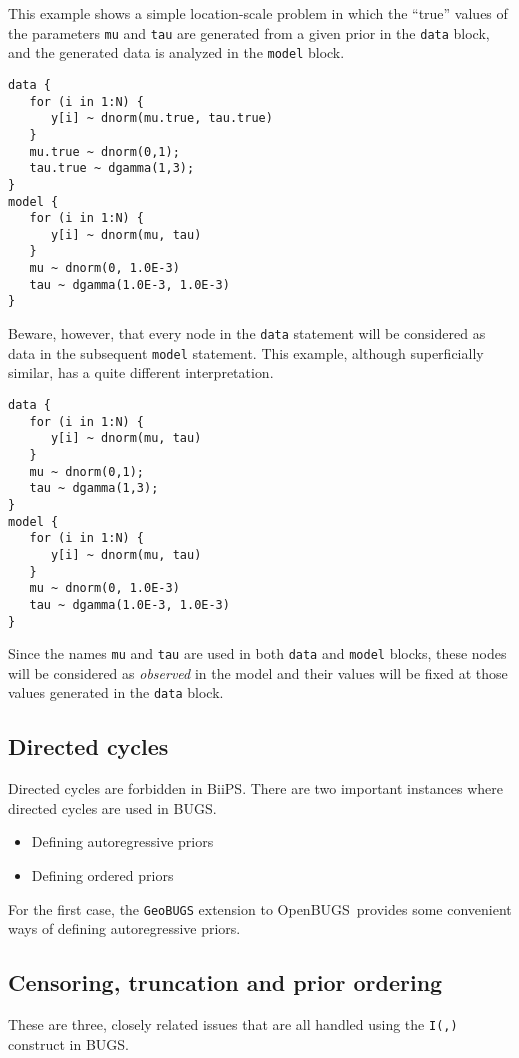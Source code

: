 \documentclass[11pt, a4paper, titlepage]{report}
\newcommand{\biips}{\textsf{BiiPS}}
\newcommand{\BUGS}{\textsf{BUGS}}
\newcommand{\OpenBUGS}{\textsf{OpenBUGS}}
\begin{document}
This example shows a simple location-scale problem in which the ``true''
values of the parameters \texttt{mu} and \texttt{tau} are generated
from a given prior in the \texttt{data} block, and the generated
data is analyzed in the \texttt{model} block.
\begin{verbatim}
data {
   for (i in 1:N) {
      y[i] ~ dnorm(mu.true, tau.true) 
   }
   mu.true ~ dnorm(0,1);
   tau.true ~ dgamma(1,3);
}
model {
   for (i in 1:N) {
      y[i] ~ dnorm(mu, tau)
   }
   mu ~ dnorm(0, 1.0E-3)
   tau ~ dgamma(1.0E-3, 1.0E-3)
}
\end{verbatim}
Beware, however, that every node in the \texttt{data} statement will
be considered as data in the subsequent \texttt{model} statement. This
example, although superficially similar, has a quite different interpretation.
\begin{verbatim}
data {
   for (i in 1:N) {
      y[i] ~ dnorm(mu, tau) 
   }
   mu ~ dnorm(0,1);
   tau ~ dgamma(1,3);
}
model {
   for (i in 1:N) {
      y[i] ~ dnorm(mu, tau)
   }
   mu ~ dnorm(0, 1.0E-3)
   tau ~ dgamma(1.0E-3, 1.0E-3)
}
\end{verbatim}
Since the names \texttt{mu} and \texttt{tau} are used in both
\texttt{data} and \texttt{model} blocks, these nodes will be
considered as {\em observed} in the model and their values will be
fixed at those values generated in the \texttt{data} block.

\subsection{Directed cycles}

Directed cycles are forbidden in \biips. There are two important
instances where directed cycles are used in \BUGS.
\begin{itemize}
\item Defining autoregressive priors
\item Defining ordered priors
\end{itemize}
For the first case, the \texttt{GeoBUGS} extension to \OpenBUGS\ provides
some convenient ways of defining autoregressive priors.

\subsection{Censoring, truncation and prior ordering}
\label{section:censoring}

These are three, closely related issues that are all handled using
the \texttt{I(,)} construct in \BUGS.
\end{document}
